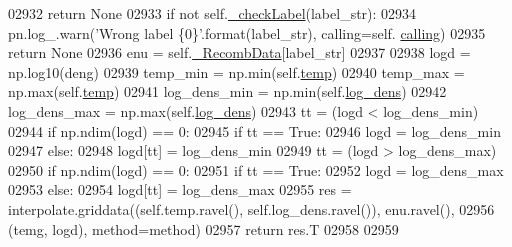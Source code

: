 \begin{DoxyCode}
02932             \textcolor{keywordflow}{return} \textcolor{keywordtype}{None}
02933         \textcolor{keywordflow}{if} \textcolor{keywordflow}{not} self.\hyperlink{classpyneb_1_1core_1_1pynebcore_1_1_rec_atom_adcc9c72bd96e9064b01591d8b32112ea}{\_checkLabel}(label\_str):
02934             pn.log\_.warn(\textcolor{stringliteral}{'Wrong label \{0\}'}.format(label\_str), calling=self.
      \hyperlink{classpyneb_1_1core_1_1pynebcore_1_1_rec_atom_a82ec425ebba32b73a5d9ae52717d47c4}{calling})
02935             \textcolor{keywordflow}{return} \textcolor{keywordtype}{None}
02936         enu = self.\hyperlink{classpyneb_1_1core_1_1pynebcore_1_1_rec_atom_a1f483d9d99af479ef137489ccefe35e9}{\_RecombData}[label\_str]
02937             
02938         logd = np.log10(deng)
02939         temp\_min = np.min(self.\hyperlink{classpyneb_1_1core_1_1pynebcore_1_1_rec_atom_afdcfb955b81391dabcb298fe4990e33c}{temp})
02940         temp\_max = np.max(self.\hyperlink{classpyneb_1_1core_1_1pynebcore_1_1_rec_atom_afdcfb955b81391dabcb298fe4990e33c}{temp})
02941         log\_dens\_min = np.min(self.\hyperlink{classpyneb_1_1core_1_1pynebcore_1_1_rec_atom_ac93e76934d279878d4f1f6d961df5488}{log\_dens})
02942         log\_dens\_max = np.max(self.\hyperlink{classpyneb_1_1core_1_1pynebcore_1_1_rec_atom_ac93e76934d279878d4f1f6d961df5488}{log\_dens})
02943         tt = (logd < log\_dens\_min)
02944         \textcolor{keywordflow}{if} np.ndim(logd) == 0: 
02945             \textcolor{keywordflow}{if} tt == \textcolor{keyword}{True}:
02946                 logd = log\_dens\_min
02947         \textcolor{keywordflow}{else}:
02948             logd[tt] = log\_dens\_min
02949         tt = (logd > log\_dens\_max)
02950         \textcolor{keywordflow}{if} np.ndim(logd) == 0:
02951             \textcolor{keywordflow}{if} tt == \textcolor{keyword}{True}:
02952                 logd = log\_dens\_max
02953         \textcolor{keywordflow}{else}:
02954             logd[tt] = log\_dens\_max
02955         res = interpolate.griddata((self.temp.ravel(), self.log\_dens.ravel()), enu.ravel(),
02956                                    (temg, logd), method=method)
02957         \textcolor{keywordflow}{return} res.T
02958 
02959 
\end{DoxyCode}
\hypertarget{classpyneb_1_1core_1_1pynebcore_1_1_rec_atom_a664340029b0a067b459cae45e13d50c5}{}
